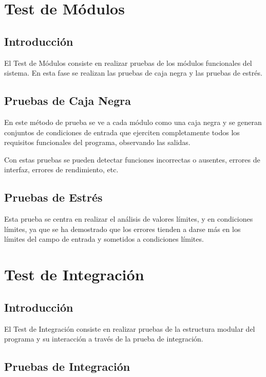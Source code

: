 \section{Test de Módulos}

\subsection{Introducción}
El Test de Módulos consiste en realizar pruebas de los módulos funcionales del sistema. En esta fase se realizan las pruebas de caja negra y las pruebas de estrés. 

\subsection{Pruebas de Caja Negra}

En este método de prueba se ve a cada módulo como una caja negra y se generan conjuntos de condiciones de entrada que ejerciten completamente todos los requisitos funcionales del programa, observando las salidas.

    Con estas pruebas se pueden detectar funciones incorrectas o ausentes, errores de interfaz, errores de rendimiento, etc.
    
\subsection{Pruebas de Estrés}

Esta prueba se centra en realizar el análisis de valores límites, y en condiciones límites, ya que se ha demostrado que los errores tienden a darse más en los límites del campo de entrada y sometidos a condiciones límites.

\section{Test de Integración}

\subsection{Introducción}

El Test de Integración consiste en realizar pruebas de la estructura modular del programa y su interacción a través de la prueba de integración.

\subsection{Pruebas de Integración}

